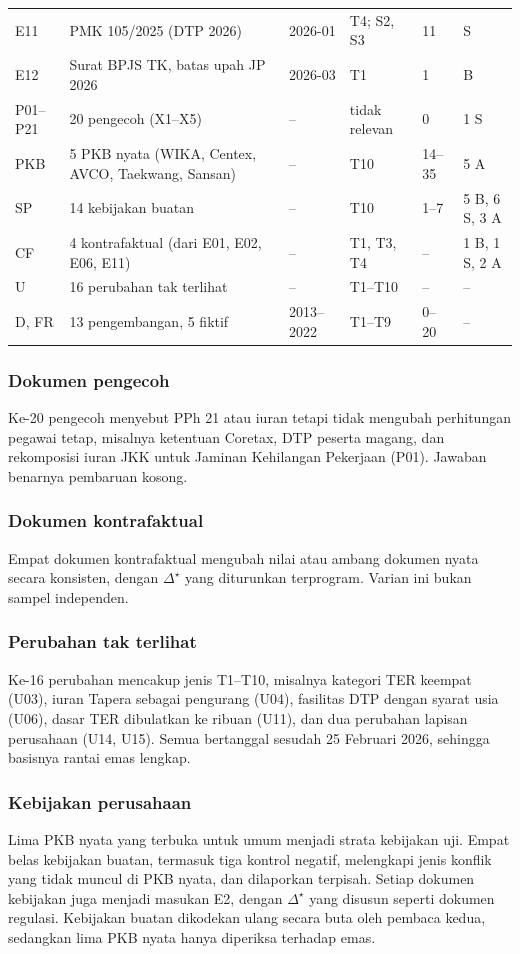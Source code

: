 \documentclass[conference]{IEEEtran}
\newcommand{\emas}{\star}
\begin{document}
\begin{table}[t]
\begin{tabularx}{\columnwidth}{@{}P{0.55cm} L P{1.0cm} P{1.1cm} P{0.55cm} P{0.75cm}@{}}
E11 & PMK 105/2025 (DTP 2026) & 2026-01 & T4; S2, S3 & 11 & S \\
E12 & Surat BPJS TK, batas upah JP 2026 & 2026-03 & T1 & 1 & B \\
\midrule
P01--P21 & 20 pengecoh (X1--X5) & -- & tidak relevan & 0 & 1 S \\
PKB & 5 PKB nyata (WIKA, Centex, AVCO, Taekwang, Sansan) & -- & T10 & 14--35 & 5 A \\
SP & 14 kebijakan buatan & -- & T10 & 1--7 & 5 B, 6 S, 3 A \\
CF & 4 kontrafaktual (dari E01, E02, E06, E11) & -- & T1, T3, T4 & -- & 1 B, 1 S, 2 A \\
U & 16 perubahan tak terlihat & -- & T1--T10 & -- & -- \\
D, FR & 13 pengembangan, 5 fiktif & 2013--2022 & T1--T9 & 0--20 & -- \\
\bottomrule
\end{tabularx}
\end{table}

\subsubsection{Dokumen pengecoh}
Ke-20 pengecoh menyebut PPh 21 atau iuran tetapi tidak mengubah perhitungan pegawai tetap, misalnya ketentuan Coretax, DTP peserta magang, dan rekomposisi iuran JKK untuk Jaminan Kehilangan Pekerjaan (P01). Jawaban benarnya pembaruan kosong.

\subsubsection{Dokumen kontrafaktual}
Empat dokumen kontrafaktual mengubah nilai atau ambang dokumen nyata secara konsisten, dengan $\Delta^{\emas}$ yang diturunkan terprogram. Varian ini bukan sampel independen.

\subsubsection{Perubahan tak terlihat}
Ke-16 perubahan mencakup jenis T1--T10, misalnya kategori TER keempat (U03), iuran Tapera sebagai pengurang (U04), fasilitas DTP dengan syarat usia (U06), dasar TER dibulatkan ke ribuan (U11), dan dua perubahan lapisan perusahaan (U14, U15). Semua bertanggal sesudah 25 Februari 2026, sehingga basisnya rantai emas lengkap.

\subsubsection{Kebijakan perusahaan}
Lima PKB nyata yang terbuka untuk umum menjadi strata kebijakan uji. Empat belas kebijakan buatan, termasuk tiga kontrol negatif, melengkapi jenis konflik yang tidak muncul di PKB nyata, dan dilaporkan terpisah. Setiap dokumen kebijakan juga menjadi masukan E2, dengan $\Delta^{\emas}$ yang disusun seperti dokumen regulasi. Kebijakan buatan dikodekan ulang secara buta oleh pembaca kedua, sedangkan lima PKB nyata hanya diperiksa terhadap emas.
\end{document}
